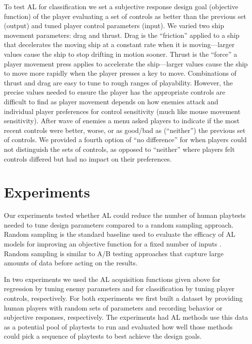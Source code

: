 \documentclass{sig-alternate}
\begin{document}
To test AL for classification we set a subjective response design goal (objective function) of the player evaluating a set of controls as better than the previous set (output) and tuned player control parameters (input).
We varied two ship movement parameters: drag and thrust. 
Drag is the ``friction'' applied to a ship that decelerates the moving ship at a constant rate when it is moving---larger values cause the ship to stop drifting in motion sooner. 
Thrust is the ``force'' a player movement press applies to accelerate the ship---larger values cause the ship to move more rapidly when the player presses a key to move. 
%
Combinations of thrust and drag are easy to tune to rough ranges of playability.
However, the precise values needed to ensure the player has the appropriate controls are difficult to find as player movement depends on how enemies attack and individual player preferences for control sensitivity (much like mouse movement sensitivity).
After wave of enemies a menu asked players to indicate if the most recent controls were better, worse, or as good/bad as (``neither'') the previous set of controls.
We provided a fourth option of ``no difference'' for when players could not distinguish the sets of controls, as opposed to ``neither'' where players felt controls differed but had no impact on their preferences.





\section{Experiments}
Our experiments tested whether AL could reduce the number of human playtests needed to tune design parameters compared to a random sampling approach.
Random sampling is the standard baseline used to evaluate the efficacy of AL models for improving an objective function for a fixed number of inputs \cite{settles2012:al-book}. 
Random sampling is similar to A/B testing approaches that capture large amounts of data before acting on the results.

In two experiments we used the AL acquisition functions given above for regression by tuning enemy parameters and for classification by tuning player controls, respectively.
For both experiments we first built a dataset by providing human players with random sets of parameters and recording behavior or subjective responses, respectively.
The experiments had AL methods use this data as a potential pool of playtests to run and evaluated how well those methods could pick a sequence of playtests to best achieve the design goals.
\end{document}
